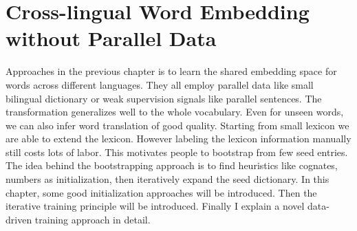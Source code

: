 \chapter{Cross-lingual Word Embedding without Parallel Data}

Approaches in the previous chapter is to learn the shared embedding space for words across different languages. They all employ parallel data like small bilingual dictionary or weak supervision signals like parallel sentences. The transformation generalizes well to the whole vocabulary. Even for unseen words, we can also infer word translation of good quality. Starting from small lexicon we are able to extend the lexicon. However labeling the lexicon information manually still costs lots of labor. This motivates people to bootstrap from few seed entries. The idea behind the bootstrapping approach is to find heuristics like cognates, numbers as initialization, then iteratively expand the seed dictionary. In this chapter, some good initialization approaches will be introduced. Then the iterative training principle will be introduced. Finally I explain a novel data-driven training approach in detail.

%
%
%
%
%
%
%
